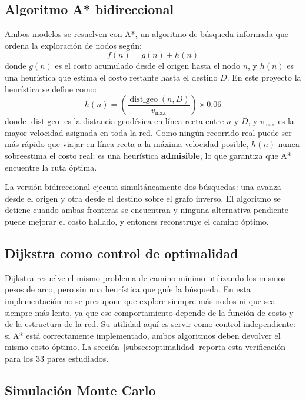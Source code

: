 \documentclass[11pt]{article}
\numberwithin{equation}{section}
\begin{document}
\subsection{Algoritmo A* bidireccional}

Ambos modelos se resuelven con A*, un algoritmo de búsqueda informada que ordena la exploración de nodos según:
\begin{equation}
    f(n) = g(n) + h(n)
    \label{eq:astar}
\end{equation}
donde $g(n)$ es el costo acumulado desde el origen hasta el nodo $n$, y $h(n)$ es una heurística que estima el costo restante hasta el destino $D$. En este proyecto la heurística se define como:
\begin{equation}
    h(n) = \left(\frac{\operatorname{dist\_geo}(n, D)}{v_{\max}}\right) \times 0.06
    \label{eq:heuristica}
\end{equation}
donde $\operatorname{dist\_geo}$ es la distancia geodésica en línea recta entre $n$ y $D$, y $v_{\max}$ es la mayor velocidad asignada en toda la red. Como ningún recorrido real puede ser más rápido que viajar en línea recta a la máxima velocidad posible, $h(n)$ nunca sobreestima el costo real: es una heurística \textbf{admisible}, lo que garantiza que A* encuentre la ruta óptima.

La versión bidireccional ejecuta simultáneamente dos búsquedas: una avanza desde el origen y otra desde el destino sobre el grafo inverso. El algoritmo se detiene cuando ambas fronteras se encuentran y ninguna alternativa pendiente puede mejorar el costo hallado, y entonces reconstruye el camino óptimo.

\subsection{Dijkstra como control de optimalidad}

Dijkstra resuelve el mismo problema de camino mínimo utilizando los mismos pesos de arco, pero sin una heurística que guíe la búsqueda. En esta implementación no se presupone que explore siempre más nodos ni que sea siempre más lento, ya que ese comportamiento depende de la función de costo y de la estructura de la red. Su utilidad aquí es servir como control independiente: si A* está correctamente implementado, ambos algoritmos deben devolver el mismo costo óptimo. La sección~\ref{subsec:optimalidad} reporta esta verificación para los 33 pares estudiados.

\subsection{Simulación Monte Carlo}
\end{document}
